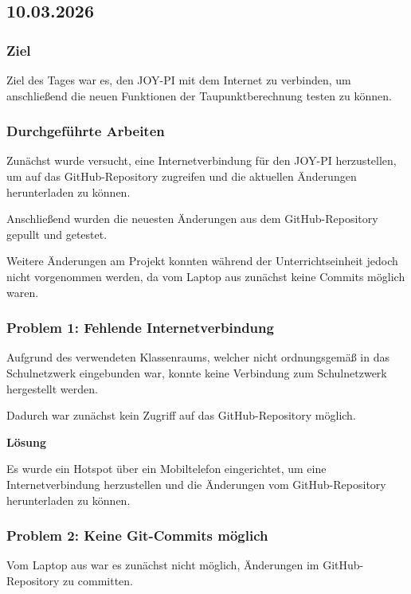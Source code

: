 \subsection{10.03.2026}

\subsubsection{Ziel}

Ziel des Tages war es, den JOY-PI mit dem Internet zu verbinden,
um anschließend die neuen Funktionen der Taupunktberechnung
testen zu können.

\subsubsection{Durchgeführte Arbeiten}

Zunächst wurde versucht, eine Internetverbindung für den
JOY-PI herzustellen, um auf das GitHub-Repository zugreifen
und die aktuellen Änderungen herunterladen zu können.

Anschließend wurden die neuesten Änderungen aus dem
GitHub-Repository gepullt und getestet.

Weitere Änderungen am Projekt konnten während der
Unterrichtseinheit jedoch nicht vorgenommen werden,
da vom Laptop aus zunächst keine Commits möglich waren.

\subsubsection{Problem 1: Fehlende Internetverbindung}

Aufgrund des verwendeten Klassenraums, welcher nicht
ordnungsgemäß in das Schulnetzwerk eingebunden war,
konnte keine Verbindung zum Schulnetzwerk hergestellt werden.

Dadurch war zunächst kein Zugriff auf das
GitHub-Repository möglich.

\textbf{Lösung}

Es wurde ein Hotspot über ein Mobiltelefon eingerichtet,
um eine Internetverbindung herzustellen und die Änderungen
vom GitHub-Repository herunterladen zu können.

\subsubsection{Problem 2: Keine Git-Commits möglich}

Vom Laptop aus war es zunächst nicht möglich,
Änderungen im GitHub-Repository zu committen.

